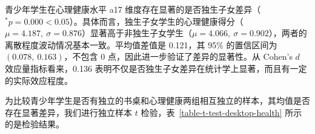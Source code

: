 \documentclass[zihao = -4, linespread = 1.5]{article}
\begin{document}
\begin{table}[htbp]
    \centering
    \setlength{\tabcolsep}{5pt}
    \renewcommand{\arraystretch}{1.5}
    \caption{学生是否独生子与心理健康的独立性样本 $t$ 检验结果}\label{table-t-test-only-child-health}
\end{table}

青少年学生在心理健康水平 a17 维度存在显著的是否独生子女差异（$^{\bm{*}}p=0.000<0.05$）。具体而言，独生子女学生的心理健康得分（$\mu=4.187,\ \sigma=0.876$）显著高于非独生子女学生（$\mu=4.066,\ \sigma=0.902$），两者的离散程度波动情况基本一致。平均值差值是 0.121，其 95\% 的置信区间为 $(0.078,\ 0.163)$，不包含 0 点，因此进一步验证了差异的显著性。从 Cohen's $d$ 效应量指标看来，0.136 表明不仅是否独生子女差异在统计学上显著，而且有一定的实际效应程度。

为比较青少年学生是否有独立的书桌和心理健康两组相互独立的样本，其均值是否存在显著差异，我们进行独立样本 $t$ 检验，表~\ref{table-t-test-desktop-health} 所示的是检验结果。

\begin{table}[htbp]
    \centering
    \setlength{\tabcolsep}{5pt}
    \renewcommand{\arraystretch}{1.5}
    \caption{学生是否有独立的书桌与心理健康的独立性样本 $t$ 检验结果}\label{table-t-test-desktop-health}
\end{table}
\end{document}
